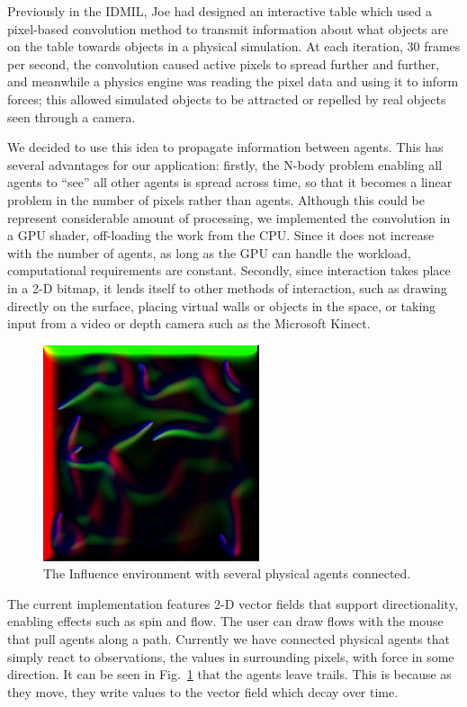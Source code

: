 \documentclass{article}
\begin{document}
Previously in the IDMIL, Joe had designed an interactive table which
used a pixel-based convolution method to transmit information about
what objects are on the table towards objects in a physical
simulation.
At each iteration, 30 frames per second, the convolution caused active
pixels to spread further and further, and meanwhile a physics engine
was reading the pixel data and using it to inform forces; this allowed
simulated objects to be attracted or repelled by real objects seen
through a camera.

We decided to use this idea to propagate information between agents.
This has several advantages for our application: firstly, the N-body
problem enabling all agents to ``see'' all other agents is spread
across time, so that it becomes a linear problem in the number of
pixels rather than agents.
Although this could be represent considerable amount of processing, we
implemented the convolution in a GPU shader, off-loading the work from
the CPU.
Since it does not increase with the number of agents, as long as the
GPU can handle the workload, computational requirements are constant.
Secondly, since interaction takes place in a 2-D bitmap, it lends
itself to other methods of interaction, such as drawing directly on
the surface, placing virtual walls or objects in the space, or taking
input from a video or depth camera such as the Microsoft Kinect.

\begin{figure}
\centerline{
  \includegraphics[width=2.5in]{influence.jpg}}
  \caption{The Influence environment with several physical agents
    connected.}
\label{fig:influence}
\end{figure}

The current implementation features 2-D vector fields that support
directionality, enabling effects such as spin and flow.
The user can draw flows with the mouse that pull agents along a path.
Currently we have connected physical agents that simply react to
observations, the values in surrounding pixels, with force in some
direction.
It can be seen in Fig.~\ref{fig:influence} that the agents leave
trails.
This is because as they move, they write values to the vector field
which decay over time.
\end{document}
